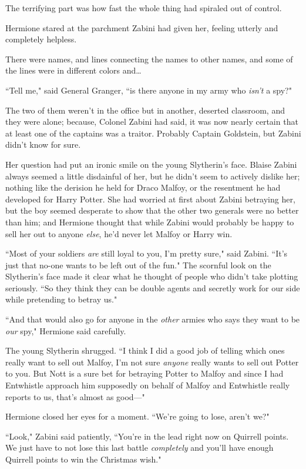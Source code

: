The terrifying part was how fast the whole thing had spiraled out of control.

Hermione stared at the parchment Zabini had given her, feeling utterly and completely helpless.

There were names, and lines connecting the names to other names, and some of the lines were in different colors and{\ldots}

``Tell me," said General Granger, ``is there anyone in my army who \emph{isn't} a spy?"

The two of them weren't in the office but in another, deserted classroom, and they were alone; because, Colonel Zabini had said, it was now nearly certain that at least one of the captains was a traitor. Probably Captain Goldstein, but Zabini didn't know for sure.

Her question had put an ironic smile on the young Slytherin's face. Blaise Zabini always seemed a little disdainful of her, but he didn't seem to actively dislike her; nothing like the derision he held for Draco Malfoy, or the resentment he had developed for Harry Potter. She had worried at first about Zabini betraying her, but the boy seemed desperate to show that the other two generals were no better than him; and Hermione thought that while Zabini would probably be happy to sell her out to anyone \emph{else}, he'd never let Malfoy or Harry win.

``Most of your soldiers \emph{are} still loyal to you, I'm pretty sure," said Zabini. ``It's just that no-one wants to be left out of the fun." The scornful look on the Slytherin's face made it clear what he thought of people who didn't take plotting seriously. ``So they think they can be double agents and secretly work for our side while pretending to betray us."

``And that would also go for anyone in the \emph{other} armies who says they want to be \emph{our} spy," Hermione said carefully.

The young Slytherin shrugged. ``I think I did a good job of telling which ones really want to sell out Malfoy, I'm not sure \emph{anyone} really wants to sell out Potter to you. But Nott is a sure bet for betraying Potter to Malfoy and since I had Entwhistle approach him supposedly on behalf of Malfoy and Entwhistle really reports to us, that's almost as good—"

Hermione closed her eyes for a moment. ``We're going to lose, aren't we?"

``Look," Zabini said patiently, ``You're in the lead right now on Quirrell points. We just have to not lose this last battle \emph{completely} and you'll have enough Quirrell points to win the Christmas wish."

